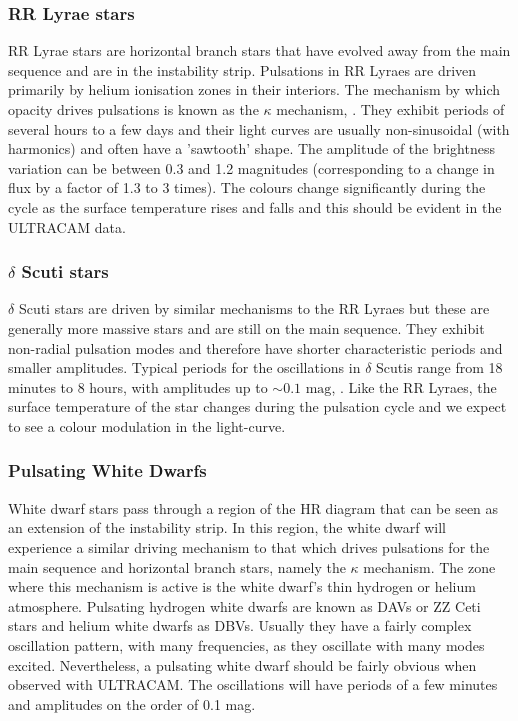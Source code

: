 \subsubsection{RR Lyrae stars}
RR Lyrae stars are horizontal branch stars that have evolved away from the main sequence and are in the instability strip. Pulsations in RR Lyraes are driven primarily by helium ionisation zones in their interiors. The mechanism by which opacity drives pulsations is known as the $\kappa$ mechanism, \citep{asteroseismology}. They exhibit periods of several hours to a few days and their light curves are usually non-sinusoidal (with harmonics) and often have a 'sawtooth' shape. The amplitude of the brightness variation can be between 0.3 and 1.2 magnitudes (corresponding to a change in flux by a factor of 1.3 to 3 times). The colours change significantly during the cycle as the surface temperature rises and falls and this should be evident in the ULTRACAM data. 

\subsubsection{$\delta$ Scuti stars}
$\delta$ Scuti stars are driven by similar mechanisms to the RR Lyraes but these are generally more massive stars and are still on the main sequence. They exhibit non-radial pulsation modes and therefore have shorter characteristic periods and smaller amplitudes. Typical periods for the oscillations in $\delta$ Scutis range from 18 minutes to 8 hours, with amplitudes up to $\sim \mbox{0.1 mag}$, \citep{KurtzBook}. Like the RR Lyraes, the surface temperature of the star changes during the pulsation cycle and we expect to see a colour modulation in the light-curve. 

\subsubsection{Pulsating White Dwarfs}
White dwarf stars pass through a region of the HR diagram that can be seen as an extension of the instability strip. In this region, the white dwarf will experience a similar driving mechanism to that which drives pulsations for the main sequence and horizontal branch stars, namely the $\kappa$ mechanism. The zone where this mechanism is active is the white dwarf's thin hydrogen or helium atmosphere. Pulsating hydrogen white dwarfs are known as {DAVs} or {ZZ Ceti} stars and helium white dwarfs as {DBV}s. Usually they have a fairly complex oscillation pattern, with many frequencies, as they oscillate with many modes excited. Nevertheless, a pulsating white dwarf should be fairly obvious when observed with ULTRACAM. The oscillations will have periods of a few minutes and amplitudes on the order of 0.1 mag. 

